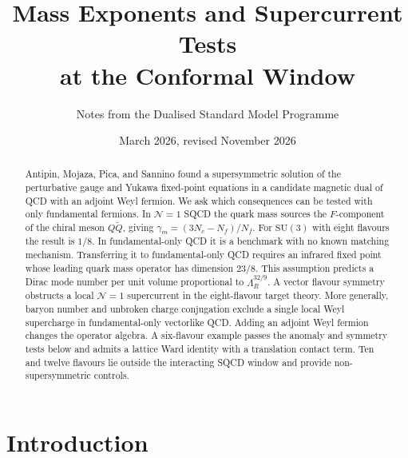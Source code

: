 \documentclass[11pt,a4paper]{article}
\theoremstyle{plain}
\theoremstyle{definition}
\theoremstyle{remark}
\newcommand{\Nc}{N_{\!c}}
\newcommand{\Nf}{N_{\!f}}
\newcommand{\SU}[1]{\mathrm{SU}(#1)}
\begin{document}
\title{\textbf{Mass Exponents and Supercurrent Tests\\
at the Conformal Window}}
\author{Notes from the Dualised Standard Model Programme}
\date{March 2026, revised November 2026}
\maketitle

\begin{abstract}
Antipin, Mojaza, Pica, and Sannino found a supersymmetric solution
of the perturbative gauge and Yukawa fixed-point equations in a
candidate magnetic dual of QCD with an adjoint Weyl fermion.  We ask
which consequences can be tested with only fundamental fermions.
In $\mathcal N=1$ SQCD the quark mass sources the $F$-component of
the chiral meson $Q\widetilde Q$, giving $\gamma_m=(3\Nc-\Nf)/\Nf$.
For $\SU{3}$ with eight flavours the result is $1/8$. In fundamental-only QCD it is a benchmark with no known matching mechanism.  Transferring
it to fundamental-only QCD requires an infrared fixed point whose
leading quark mass operator has dimension $23/8$.  This assumption
predicts a Dirac mode number per unit volume proportional to
$\Lambda_R^{32/9}$.  A vector flavour symmetry obstructs a local
$\mathcal N=1$ supercurrent in the eight-flavour target theory.
More generally, baryon number and unbroken charge conjugation exclude
a single local Weyl supercharge in fundamental-only vectorlike QCD.
Adding an adjoint Weyl fermion changes the operator algebra. A
six-flavour example passes the anomaly and symmetry tests below and
admits a lattice Ward identity with a translation contact term.
Ten and twelve flavours lie outside the interacting SQCD window and
provide non-supersymmetric controls.
\end{abstract}

\tableofcontents
\newpage


\section{Introduction}
\label{sec:introduction}
\end{document}
